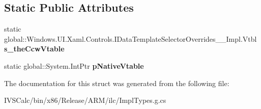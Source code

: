 \subsection*{Static Public Attributes}
\begin{DoxyCompactItemize}
\item 
\mbox{\label{struct_windows_1_1_u_i_1_1_xaml_1_1_controls_1_1_i_data_template_selector_overrides_____impl_1_1_vtbl_a23b7ec3b2c7d26beecdc1dea54e27c4f}} 
static global\+::\+Windows.\+U\+I.\+Xaml.\+Controls.\+I\+Data\+Template\+Selector\+Overrides\+\_\+\+\_\+\+Impl.\+Vtbl {\bfseries s\+\_\+the\+Ccw\+Vtable}
\item 
\mbox{\label{struct_windows_1_1_u_i_1_1_xaml_1_1_controls_1_1_i_data_template_selector_overrides_____impl_1_1_vtbl_a5bbae67c2effe11651d618c5f96e4b4e}} 
static global\+::\+System.\+Int\+Ptr {\bfseries p\+Native\+Vtable}
\end{DoxyCompactItemize}


The documentation for this struct was generated from the following file\+:\begin{DoxyCompactItemize}
\item 
I\+V\+S\+Calc/bin/x86/\+Release/\+A\+R\+M/ilc/Impl\+Types.\+g.\+cs\end{DoxyCompactItemize}
